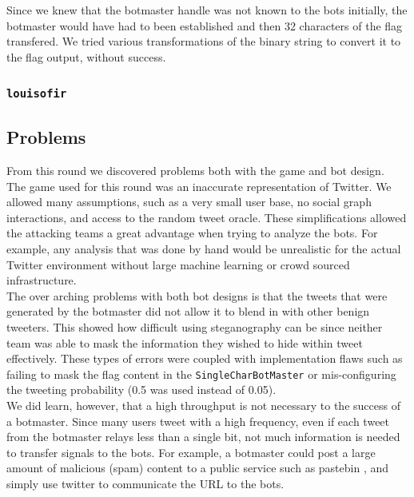 \documentclass[11pt, oneside]{article} %
\numberwithin{equation}{section} %
\numberwithin{figure}{section} %
\numberwithin{table}{section} %
\renewcommand{\c}[1]{\texttt{#1}}
\newcommand{\teamol}{\c{louisofir}}
\begin{document}
			Since we knew that the botmaster handle was not known to the bots initially, the botmaster would have had to been established and then 32 characters of the flag transfered. We tried various transformations of the binary string to convert it to the flag output, without success. 

		\subsubsection{\teamol{}}

	\subsection{Problems}
		From this round we discovered problems both with the game and bot design. \\

		The game used for this round was an inaccurate representation of Twitter. We allowed many assumptions, such as a very small user base, no social graph interactions, and access to the random tweet oracle. These simplifications allowed the attacking teams a great advantage when trying to analyze the bots. For example, any analysis that was done by hand would be unrealistic for the actual Twitter environment without large machine learning or crowd sourced infrastructure. \\ 
		
		The over arching problems with both bot designs is that the tweets that were generated by the botmaster did not allow it to blend in with other benign tweeters. This showed how difficult using steganography can be since neither team was able to mask the information they wished to hide within tweet effectively. These types of errors were coupled with implementation flaws such as failing to mask the flag content in the \c{SingleCharBotMaster} or mis-configuring the tweeting probability (0.5 was used instead of 0.05). \\

		We did learn, however, that a high throughput is not necessary to the success of a botmaster. Since many users tweet with a high frequency, even if each tweet from the botmaster relays less than a single bit, not much information is needed to transfer signals to the bots. For example, a botmaster could post a large amount of malicious (spam) content to a public service such as pastebin \cite{pastebin}, and simply use twitter to communicate the URL to the bots. \\
\end{document}

